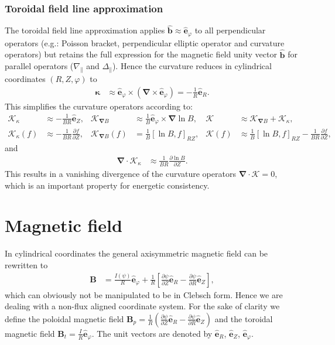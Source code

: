 \documentclass{hitec} %
\renewcommand{\vec}[1]{\boldsymbol{#1}}
\begin{document}
\subsubsection{Toroidal field line approximation}\label{sec:torfieldlineapprox}
The toroidal field line approximation applies \(\vec{\hat{b}}\approx \vec{\hat{e}}_\varphi\) to all perpendicular operators (e.g.: Poisson bracket, perpendicular elliptic operator and curvature operators) 
but retains the full expression for the magnetic field unity vector \(\vec{\hat{b}}\) 
for parallel operators (\(\nabla_\parallel\) and \(\Delta_\parallel\)). 
Hence the curvature reduces in cylindrical coordinates \((R,Z,\varphi)\) to 
\begin{align}\label{eq:kappalowbeta}
 \vec{\kappa} &\approx \vec{\hat{e}}_\varphi \times \left(\vec{\nabla} \times \vec{\hat{e}}_\varphi \right) = -  \frac{1}{R} \vec{\hat{e}}_R.
\end{align}
This simplifies the curvature operators according to:
\begin{align}
\vec{\mathcal{K}}_{\kappa}  &\approx  -  \frac{1}{B R} \vec{\hat{e}}_Z , &  
\vec{ \mathcal{K} }_{\vec{\nabla}  B}  &\approx \frac{1}{B}\vec{\hat{e}}_\varphi \times \vec{\nabla} \ln B, &
\vec{ \mathcal{K} } &\approx \vec{ \mathcal{K} }_{\vec{\nabla}  B}  +\vec{ \mathcal{K} }_{\kappa} ,\\
\mathcal{K}_{\kappa}(f)   &\approx  -  \frac{1}{B R} \frac{\partial f}{\partial Z},& 
\mathcal{K}_{\vec{\nabla}  B} (f)  &= \frac{1}{B} \left[\ln B, f \right]_{RZ},& 
\mathcal{K} (f) &\approx\frac{1}{B} \left[\ln B, f \right]_{RZ}-  \frac{1}{B R} \frac{\partial f}{\partial Z} ,
\end{align}
and
\begin{align}
 \vec{\nabla} \cdot \vec{\mathcal{K}}_{\kappa} &\approx \frac{1}{B R} \frac{\partial \ln B}{\partial Z}.
\end{align}
This results in a vanishing divergence of the curvature operators \( \vec{\nabla} \cdot \vec{ \mathcal{K} } = 0\), which is an important property for energetic consistency.
\section{Magnetic field}
In cylindrical coordinates the general axisymmetric magnetic field can be rewritten to
\begin{align}
 \vec{B} &= \frac{I(\psi)}{R} \vec{\hat{e}}_{\varphi} + \frac{1}{R}\left[\frac{\partial \psi}{\partial Z} \vec{\hat{e}}_R 
         -  \frac{\partial \psi}{\partial R} \vec{\hat{e}}_Z\right] ,
\end{align}
which can obviously not be manipulated to be in Clebsch form. Hence we are dealing with a non-flux aligned coordinate system. 
For the sake of clarity we define the poloidal magnetic field \( \vec{B}_p = \frac{1}{R}\left( \frac{\partial \psi}{\partial Z}\vec{\hat{e}}_R - \frac{\partial \psi}{\partial R}\vec{\hat{e}}_Z\right) 
\) and the toroidal magnetic field \(\vec{B}_t =\frac{I}{R} \vec{\hat{e}}_{\varphi}\).
The unit vectors are denoted by \(\vec{\hat{e}}_{R}\), \(\vec{\hat{e}}_{Z}\), \(\vec{\hat{e}}_{\varphi}\).
\end{document}
